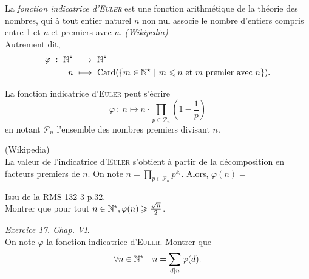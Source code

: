 \begin{defi}
    La \emph{fonction indicatrice d'\textsc{Euler}} est une fonction arithmétique de la théorie des nombres, qui à tout entier naturel $n$ non nul associe le nombre d'entiers compris entre 1 et $n$ et premiers avec $n$. \emph{(Wikipedia)} \\
    Autrement dit, 
    \begin{alignat*}{2}
        \varphi\ :\ \mathbb{N}^\star\ &\longrightarrow\ \mathbb{N}^\star\\
        n\ &\longmapsto\ \mathrm{Card}(\{m \in \mathbb{N}^\star\ |\ m \leqslant n \text{ et } m \text{ premier avec } n \}).
    \end{alignat*}
\end{defi}


\begin{prop}
    La fonction indicatrice d'\textsc{Euler} peut s'écrire
    $$\varphi\ :\ n \longmapsto n \cdot \prod_{p \in \mathscr{P}_n} \left(1 - \frac{1}{p} \right)$$
    en notant $\mathscr{P}_n$ l'ensemble des nombres premiers divisant $n$.
\end{prop}

\begin{preuve}
    (Wikipedia) \\
    La valeur de l'indicatrice d'\textsc{Euler} s'obtient à partir de la décomposition en facteurs premiers de $n$. On note $n = \prod\limits_{p \in \mathscr{P}_n} p^{k_i}$. Alors, $\varphi(n) = $
\end{preuve}

\begin{exercice}
    Issu de la RMS 132 3 p.32. \\
    Montrer que pour tout $n \in \mathbb{N}^\star, \varphi(n) \geqslant \frac{\sqrt{n}}{2}$.
\end{exercice}

\begin{exercice}
\emph{Exercice 17. Chap. VI}. \\
    On note $\varphi$ la fonction indicatrice d'\textsc{Euler}. Montrer que 
    $$\forall n \in \mathbb{N}^\star \quad n = \sum_{d|n} \varphi(d).$$
\end{exercice}

